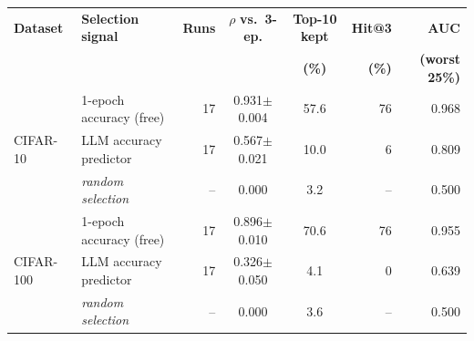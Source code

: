 \begin{tabular}{l l r cc rr}
\toprule
\textbf{Dataset} & \textbf{Selection signal} & \textbf{Runs} & $\rho$ \textbf{vs.\ 3-ep.} & \textbf{Top-10 kept} & \textbf{Hit@3} & \textbf{AUC} \\
 & & & & \textbf{(\%)} & \textbf{(\%)} & \textbf{(worst 25\%)} \\
\midrule
\multirow{3}{*}{CIFAR-10} & 1-epoch accuracy (free) & 17 & 0.931$\pm$0.004 & 57.6 & 76 & 0.968 \\
 & LLM accuracy predictor & 17 & 0.567$\pm$0.021 & 10.0 & 6 & 0.809 \\
 & \textit{random selection} & -- & 0.000 & 3.2 & -- & 0.500 \\
\midrule
\multirow{3}{*}{CIFAR-100} & 1-epoch accuracy (free) & 17 & 0.896$\pm$0.010 & 70.6 & 76 & 0.955 \\
 & LLM accuracy predictor & 17 & 0.326$\pm$0.050 & 4.1 & 0 & 0.639 \\
 & \textit{random selection} & -- & 0.000 & 3.6 & -- & 0.500 \\
\bottomrule
\end{tabular}